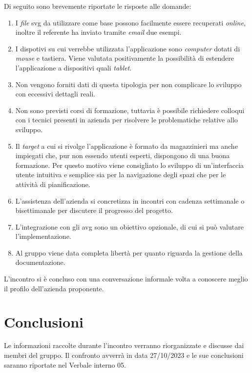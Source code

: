 \noindent
Di seguito sono brevemente riportate le risposte alle domande:
\begin{enumerate}
    \item I \textit{file} svg da utilizzare come base possono facilmente essere recuperati \textit{online}, inoltre il referente ha inviato tramite \textit{email} due esempi.
    \item I dispotivi su cui verrebbe utilizzata l'applicazione sono \textit{computer} dotati di \textit{mouse} e tastiera. Viene valutata positivamente la possibilità di estendere l'applicazione a dispositivi quali \textit{tablet}.
    \item Non vengono forniti dati di questa tipologia per non complicare lo sviluppo con eccessivi dettagli reali.
	\item Non sono previsti corsi di formazione, tuttavia è possibile richiedere colloqui con i tecnici presenti in azienda per risolvere le problematiche relative allo sviluppo.
	\item Il \textit{target} a cui si rivolge l'applicazione è formato da magazzinieri ma anche impiegati che, pur non essendo utenti esperti, dispongono di una buona formazione. Per questo motivo viene consigliato lo sviluppo di un'interfaccia utente intuitiva e semplice sia per la navigazione degli spazi che per le attività di pianificazione.
    \item L'assistenza dell'azienda si concretizza in incontri con cadenza settimanale o bisettimanale per discutere il progresso del progetto.
	\item L'integrazione con gli avg sono un obiettivo opzionale, di cui si può valutare l'implementazione.
    \item Al gruppo viene data completa libertà per quanto riguarda la gestione della documentazione. 
\end{enumerate}

\noindent
L'incontro si è concluso con una conversazione informale volta a conoscere meglio il profilo dell'azienda proponente.

\section{Conclusioni}
Le informazioni raccolte durante l'incontro verranno riorganizzate e discusse dai membri del gruppo.
Il confronto avverrà in data 27/10/2023 e le sue conclusioni saranno riportate nel Verbale interno 05.
